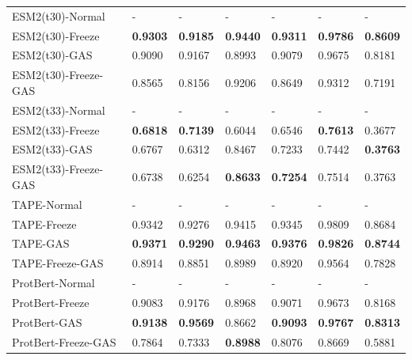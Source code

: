 \begin{table}[h]
{\begin{tabular}{lllllll}
		ESM2(t30)-Normal            & -                 & -                  & -               & -                 & -               & -               \\
		ESM2(t30)-Freeze     & \textbf{0.9303}   & \textbf{0.9185}    & \textbf{0.9440} & \textbf{0.9311}   & \textbf{0.9786} & \textbf{0.8609} \\
		ESM2(t30)-GAS        & 0.9090            & 0.9167             & 0.8993          & 0.9079            & 0.9675          & 0.8181          \\
		ESM2(t30)-Freeze-GAS & 0.8565            & 0.8156             & 0.9206          & 0.8649            & 0.9312          & 0.7191          \\ \midrule
		ESM2(t33)-Normal            & -                 & -                  & -               & -                 & -               & -               \\
		ESM2(t33)-Freeze     & \textbf{0.6818}   & \textbf{0.7139}    & 0.6044          & 0.6546            & \textbf{0.7613} & 0.3677          \\
		ESM2(t33)-GAS        & 0.6767            & 0.6312             & 0.8467          & 0.7233            & 0.7442          & \textbf{0.3763} \\
		ESM2(t33)-Freeze-GAS & 0.6738            & 0.6254             & \textbf{0.8633} & \textbf{0.7254}   & 0.7514          & 0.3763          \\ \midrule
		TAPE-Normal                 & -                 & -                  & -               & -                 & -               & -               \\
		TAPE-Freeze          & 0.9342            & 0.9276             & 0.9415          & 0.9345            & 0.9809          & 0.8684          \\
		TAPE-GAS             & \textbf{0.9371}   & \textbf{0.9290}    & \textbf{0.9463} & \textbf{0.9376}   & \textbf{0.9826} & \textbf{0.8744} \\
		TAPE-Freeze-GAS      & 0.8914            & 0.8851             & 0.8989          & 0.8920            & 0.9564          & 0.7828          \\ \midrule
		ProtBert-Normal             & -                 & -                  & -               & -                 & -               & -               \\
		ProtBert-Freeze      & 0.9083            & 0.9176             & 0.8968          & 0.9071            & 0.9673          & 0.8168          \\
		ProtBert-GAS         & \textbf{0.9138}   & \textbf{0.9569}    & 0.8662          & \textbf{0.9093}   & \textbf{0.9767} & \textbf{0.8313} \\
		ProtBert-Freeze-GAS  & 0.7864            & 0.7333             & \textbf{0.8988} & 0.8076            & 0.8669          & 0.5881         \\ 
	\end{tabular}}
\end{table}


